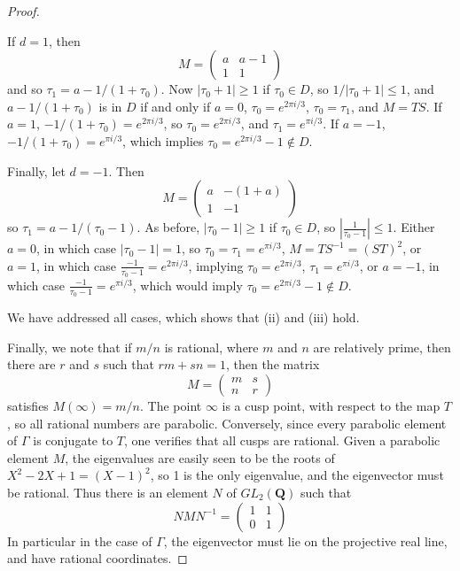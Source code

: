 \begin{proof}
\begin{itemize}
        If $d = 1$, then
        \[ M = \begin{pmatrix} a & a-1 \\ 1 & 1 \end{pmatrix} \]
        and so $\tau_1 = a - 1/(1 + \tau_0)$. Now $|\tau_0+1| \geq 1$ if $\tau_0 \in D$, so $1/|\tau_0 + 1| \leq 1$, and $a - 1/(1 + \tau_0)$ is in $D$ if and only if $a = 0$, $\tau_0 = e^{2\pi i/3}$, $\tau_0 = \tau_1$, and $M = TS$. If $a = 1$, $- 1/(1 + \tau_0) = e^{2\pi i/3}$, so $\tau_0 = e^{2 \pi i/3}$, and $\tau_1 = e^{\pi i/3}$. If $a = -1$, $- 1/(1 + \tau_0) = e^{\pi i/3}$, which implies $\tau_0 = e^{2 \pi i/3} - 1 \not \in D$.

        Finally, let $d = -1$. Then
        \[ M = \begin{pmatrix} a & -(1 + a) \\ 1 & -1 \end{pmatrix} \]
        so $\tau_1 = a - 1/(\tau_0-1)$. As before, $|\tau_0-1| \geq 1$ if $\tau_0 \in D$, so $|\frac{1}{\tau_0-1}| \leq 1$. Either $a = 0$, in which case $|\tau_0-1| = 1$, so $\tau_0 = \tau_1 = e^{\pi i/3}$, $M = TS^{-1} = (ST)^2$, or $a = 1$, in which case $\frac{-1}{\tau_0-1} = e^{2\pi i/3}$, implying $\tau_0 = e^{2\pi i/3}$, $\tau_1 = e^{\pi i/3}$, or $a = -1$, in which case $\frac{-1}{\tau_0-1} = e^{\pi i/3}$, which would imply $\tau_0 = e^{2\pi i/3} - 1 \not \in D$.
    \end{itemize}
    We have addressed all cases, which shows that (ii) and (iii) hold.

    Finally, we note that if $m/n$ is rational, where $m$ and $n$ are relatively prime, then there are $r$ and $s$ such that $rm + sn = 1$, then the matrix
    \[ M = \begin{pmatrix} m & s \\ n & r \end{pmatrix} \]
    satisfies $M(\infty) = m/n$. The point $\infty$ is a cusp point, with respect to the map $T$, so all rational numbers are parabolic. Conversely, since every parabolic element of $\Gamma$ is conjugate to $T$, one verifies that all cusps are rational. Given a parabolic element $M$, the eigenvalues are easily seen to be the roots of $X^2 -2X + 1 = (X - 1)^2$, so 1 is the only eigenvalue, and the eigenvector must be rational. Thus there is an element $N$ of $GL_2(\mathbf{Q})$ such that
    \[ NMN^{-1} = \begin{pmatrix} 1 & 1 \\ 0 & 1 \end{pmatrix} \]
    In particular in the case of $\Gamma$, the eigenvector must lie on the projective real line, and have rational coordinates.
\end{proof}

